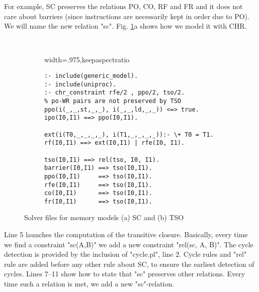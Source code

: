 For example, SC preserves the relations PO, CO, RF and FR
and it does not care about barriers (since instructions 
are necessarily kept in order due to PO). 
We will name the new relation "sc".
Fig. \ref{fig:models}a shows how we model 
it with CHR. 
\begin{figure}
  \begin{subfigure}[t]{.43\textwidth}
    \begin{adjustbox}{width=.975\textwidth,keepaspectratio}
\begin{lstlisting}[language=chr]
:- include(generic_model).
:- include(cycle).
:- chr_constraint sc/2.

sc(I0,I1) ==> rel(sc, I0, I1).

sc(I0,I1), sc(I0,I1) <=> sc(I0,I1).
po(I0,I1) ==> sc(I0,I1).
co(I0,I1) ==> sc(I0,I1).
rf(I0,I1) ==> sc(I0,I1).
fr(I0,I1) ==> sc(I0,I1).
\end{lstlisting}}
    \end{adjustbox}
  \end{subfigure}
~~~
  \begin{subfigure}[t]{0.57\textwidth}
    \begin{adjustbox}{width=.975\textwidth,keepaspectratio}
\begin{lstlisting}[language=chr]
:- include(generic_model).
:- include(uniproc).
:- chr_constraint rfe/2 , ppo/2, tso/2.
% po-WR pairs are not preserved by TSO
ppo(i(_,_,st,_,_), i(_,_,ld,_,_)) <=> true.
ipo(I0,I1) ==> ppo(I0,I1).

ext(i(T0,_,_,_,_), i(T1,_,_,_,_)):- \+ T0 = T1.
rf(I0,I1) ==> ext(I0,I1) | rfe(I0, I1).

tso(I0,I1) ==> rel(tso, I0, I1).
barrier(I0,I1) ==> tso(I0,I1).
ppo(I0,I1)     ==> tso(I0,I1).
rfe(I0,I1)     ==> tso(I0,I1).
co(I0,I1)      ==> tso(I0,I1).
fr(I0,I1)      ==> tso(I0,I1).
\end{lstlisting}
\end{adjustbox}
  \end{subfigure}
\vspace*{-2mm}
\caption{Solver files for memory models (a) SC and (b) TSO}
\vspace*{-3mm}
\label{fig:models}
\end{figure}
Line 5 launches the computation of the transitive closure. 
Basically, every time we find a constraint "sc(A,B)"
we add a new constraint "rel(sc, A, B)". The cycle detection
is provided by the inclusion of "cycle.pl", line 2. 
Cycle rules and "rel" rule are added before any other rule about SC, 
to ensure the earliest detection of cycles.
Lines 7--11 show how to state that "sc" preserves other relations.
Every time such a relation is met, we add a new
"sc"-relation. %

